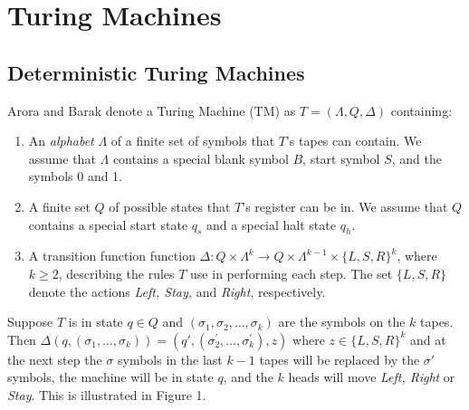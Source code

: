 \documentclass[11pt]{article}
\begin{document}
\section{Turing Machines} 

\subsection{Deterministic Turing Machines} 

 Arora and Barak denote a Turing Machine (TM) as $ T = (\Lambda, Q, \Delta) $ containing:
\begin{enumerate}
\item An \textit{alphabet} $ \Lambda $ of a finite set of symbols that $ T $'s tapes can contain. We assume that $ \Lambda $ contains a special blank symbol $ B $, start symbol $ S $, and the symbols 0 and 1. 
\item A finite set $ Q $ of possible states that $ T $'s register can be in. We assume that $ Q $ contains a special start state $ q_{s} $ and a special halt state $ q_{h} $. 
\item A transition function function $ \Delta : Q \times \Lambda^{k} \rightarrow Q \times \Lambda^{k - 1} \times \{L, S, R\}^{k} $, where $ k \geq 2$, describing the rules $ T $ use in performing each step. The set $\{L ,S, R\}$ denote the actions \textit{Left, Stay,} and \textit{Right}, respectively. 
\end{enumerate}

Suppose $ T $ is in state $ q \in Q $ and $ (\sigma_1, \sigma_2, \dots, \sigma_k) $ are the symbols on the $ k $ tapes. Then $ \Delta(q, (\sigma_1, \dots, \sigma_k)) = (q', (\sigma_{2}^{'}, \dots, \sigma_{k}^{'}), z) $ where $ z \in \{L, S, R\}^k $ and at the next step the $ \sigma $ symbols in the last $ k - 1 $ tapes will be replaced by the $ \sigma' $ symbols, the machine will be in state $ q $, and the $ k $ heads will move \textit{Left, Right} or \textit{Stay}. This is illustrated in Figure 1. \\
\end{document}
